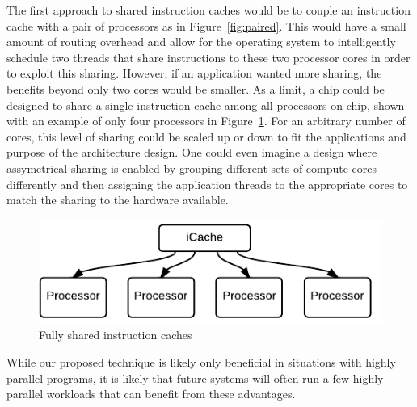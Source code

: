 The first approach to shared instruction caches would be to couple an
instruction cache with a pair of processors as in
Figure~\ref{fig:paired}. 
This would have a small amount of routing overhead and allow for the
operating system to intelligently schedule two threads that share
instructions to these two processor cores in order to exploit this
sharing. 
However, if an application wanted more sharing, the benefits beyond
only two cores would be smaller.
As a limit, a chip could be designed to share a single instruction
cache among all processors on chip, shown with an example of only four
processors in Figure~\ref{fig:shared}.
For an arbitrary number of cores, this level of sharing could be
scaled up or down to fit the applications and purpose of the
architecture design.
One could even imagine a design where assymetrical sharing is enabled
by grouping different sets of compute cores differently and then
assigning the application threads to the appropriate cores to match
the sharing to the hardware available.

\begin{figure}[ht!]
\centering
\includegraphics[width=\columnwidth]{graphics/SharedCaches}
\caption{Fully shared instruction caches}
\label{fig:shared}
\end{figure}

While our proposed technique is likely only beneficial in situations
with highly parallel programs, it is likely that future systems will
often run a few highly parallel workloads that can benefit from these
advantages. 

 




